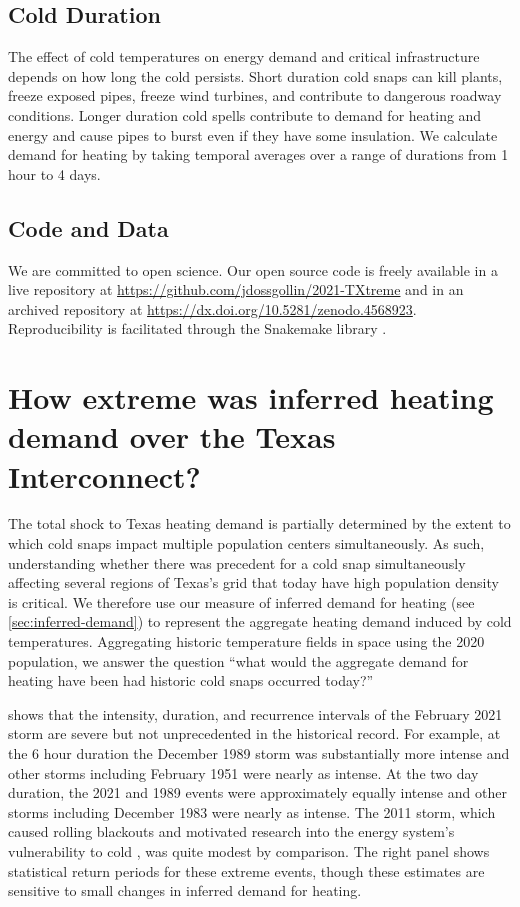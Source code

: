 \documentclass[12pt]{iopart}
\begin{document}
\subsection{Cold Duration}

The effect of cold temperatures on energy demand and critical infrastructure depends on how long the cold persists.
Short duration cold snaps can kill plants, freeze exposed pipes, freeze wind turbines, and contribute to dangerous roadway conditions.
Longer duration cold spells contribute to demand for heating and energy and cause pipes to burst even if they have some insulation.
We calculate demand for heating by taking temporal averages over a range of durations from 1 hour to 4 days.

\subsection{Code and Data}

We are committed to open science.
Our open source code is freely available in a live repository at \url{https://github.com/jdossgollin/2021-TXtreme} and in an archived repository at \url{https://dx.doi.org/10.5281/zenodo.4568923}.
Reproducibility is facilitated through the Snakemake library \cite{koster_snakemake:2012}.

\section{How extreme was inferred heating demand over the Texas Interconnect?}

The total shock to Texas heating demand is partially determined by the extent to which cold snaps impact multiple population centers simultaneously.
As such, understanding whether there was precedent for a cold snap simultaneously affecting several regions of Texas's grid that today have high population density is critical.
We therefore use our measure of inferred demand for heating (see \cref{sec:inferred-demand}) to represent the aggregate heating demand induced by cold temperatures.
Aggregating historic temperature fields in space using the 2020 population, we answer the question ``what would the aggregate demand for heating have been had historic cold snaps occurred today?''

 shows that the intensity, duration, and recurrence intervals of the February 2021 storm are severe but not unprecedented in the historical record.
For example, at the 6 hour duration the December 1989 storm was substantially more intense and other storms including February 1951 were nearly as intense.
At the two day duration, the 2021 and 1989 events were approximately equally intense and other storms including December 1983 were nearly as intense.
The 2011 storm, which caused rolling blackouts and motivated research into the energy system's vulnerability to cold \cite{ferc_outages:2011}, was quite modest by comparison.
The right panel shows statistical return periods for these extreme events, though these estimates are sensitive to small changes in inferred demand for heating.
\end{document}
